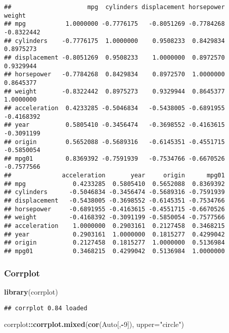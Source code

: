 \documentclass[]{article}
\newenvironment{Shaded}{\begin{snugshade}}{\end{snugshade}}
\newcommand{\KeywordTok}[1]{\textcolor[rgb]{0.13,0.29,0.53}{\textbf{#1}}}
\newcommand{\DataTypeTok}[1]{\textcolor[rgb]{0.13,0.29,0.53}{#1}}
\newcommand{\DecValTok}[1]{\textcolor[rgb]{0.00,0.00,0.81}{#1}}
\newcommand{\StringTok}[1]{\textcolor[rgb]{0.31,0.60,0.02}{#1}}
\newcommand{\OperatorTok}[1]{\textcolor[rgb]{0.81,0.36,0.00}{\textbf{#1}}}
\newcommand{\NormalTok}[1]{#1}
\begin{document}
\begin{verbatim}
##                     mpg  cylinders displacement horsepower     weight
## mpg           1.0000000 -0.7776175   -0.8051269 -0.7784268 -0.8322442
## cylinders    -0.7776175  1.0000000    0.9508233  0.8429834  0.8975273
## displacement -0.8051269  0.9508233    1.0000000  0.8972570  0.9329944
## horsepower   -0.7784268  0.8429834    0.8972570  1.0000000  0.8645377
## weight       -0.8322442  0.8975273    0.9329944  0.8645377  1.0000000
## acceleration  0.4233285 -0.5046834   -0.5438005 -0.6891955 -0.4168392
## year          0.5805410 -0.3456474   -0.3698552 -0.4163615 -0.3091199
## origin        0.5652088 -0.5689316   -0.6145351 -0.4551715 -0.5850054
## mpg01         0.8369392 -0.7591939   -0.7534766 -0.6670526 -0.7577566
##              acceleration       year     origin      mpg01
## mpg             0.4233285  0.5805410  0.5652088  0.8369392
## cylinders      -0.5046834 -0.3456474 -0.5689316 -0.7591939
## displacement   -0.5438005 -0.3698552 -0.6145351 -0.7534766
## horsepower     -0.6891955 -0.4163615 -0.4551715 -0.6670526
## weight         -0.4168392 -0.3091199 -0.5850054 -0.7577566
## acceleration    1.0000000  0.2903161  0.2127458  0.3468215
## year            0.2903161  1.0000000  0.1815277  0.4299042
## origin          0.2127458  0.1815277  1.0000000  0.5136984
## mpg01           0.3468215  0.4299042  0.5136984  1.0000000
\end{verbatim}

\subsubsection{Corrplot}\label{corrplot}

\begin{Shaded}
\begin{Highlighting}[]
\KeywordTok{library}\NormalTok{(corrplot)}
\end{Highlighting}
\end{Shaded}

\begin{verbatim}
## corrplot 0.84 loaded
\end{verbatim}

\begin{Shaded}
\begin{Highlighting}[]
\NormalTok{corrplot}\OperatorTok{::}\KeywordTok{corrplot.mixed}\NormalTok{(}\KeywordTok{cor}\NormalTok{(Auto[,}\OperatorTok{-}\DecValTok{9}\NormalTok{]), }\DataTypeTok{upper=}\StringTok{"circle"}\NormalTok{)}
\end{Highlighting}
\end{Shaded}
\end{document}
